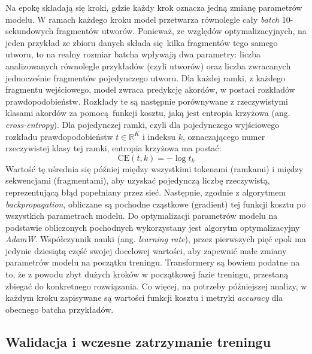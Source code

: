 Na epokę składają się kroki, gdzie każdy krok oznacza jedną zmianę parametrów modelu. W ramach każdego kroku model przetwarza równolegle cały \emph{batch} 10-sekundowych fragmentów utworów.  Ponieważ, ze względów optymalizacyjnych, na jeden przykład ze zbioru danych składa się kilka fragmentów tego samego utworu, to na realny rozmiar batcha wpływają dwa parametry: liczba analizowanych równolegle przykładów (czyli utworów) oraz liczba zwracanych jednocześnie fragmentów pojedynczego utworu. Dla każdej ramki, z każdego fragmentu wejściowego, model zwraca predykcję akordów, w postaci rozkładów prawdopodobieństw. Rozkłady te są następnie porównywane z rzeczywistymi klasami akordów za pomocą funkcji kosztu, jaką jest entropia krzyżowa (ang. \emph{cross-entropy}). Dla pojedynczej ramki, czyli dla pojedynczego wyjściowego rozkładu prawdopodobieństw $t \in \mathbb{R}^K$ i indeksu $k$, oznaczającego numer rzeczywistej klasy tej ramki, entropia krzyżowa ma postać:
\begin{equation}
    \textrm{CE}(t, k) = - \log t_k
\end{equation}
Wartość tę uśrednia się później między wszystkimi tokenami (ramkami) i między sekwencjami (fragmentami), aby uzyskać pojedynczą liczbę rzeczywistą, reprezentującą błąd popełniany przez sieć.  Następnie, zgodnie z algorytmem \emph{backpropagation}, obliczane są pochodne cząstkowe (gradient) tej funkcji kosztu po wszystkich parametrach modelu. Do optymalizacji parametrów modelu na podstawie obliczonych pochodnych wykorzystany jest algorytm optymalizacyjny \emph{AdamW}. Współczynnik nauki (ang. \emph{learning rate}), przez pierwszych pięć epok ma jedynie dziesiątą część swojej docelowej wartości, aby zapewnić małe zmiany parametrów modelu na początku treningu. Transformery są bowiem podatne na to, że z powodu zbyt dużych kroków w początkowej fazie treningu, przestaną zbiegać do konkretnego rozwiązania. Co więcej, na potrzeby późniejszej analizy, w każdym kroku zapisywane są wartości funkcji kosztu i metryki \emph{accuracy} dla obecnego batcha przykładów.

\subsection{Walidacja i wczesne zatrzymanie treningu}

